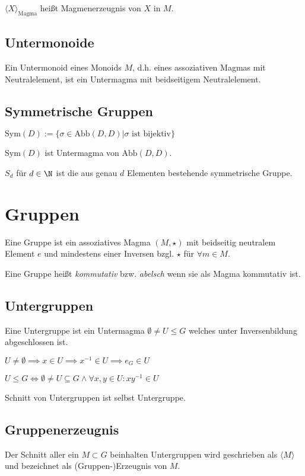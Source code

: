 $\langle X \rangle_{\text{Magma}}$ heißt Magmenerzeugnis von $X$ in $M$.

\subsection*{Untermonoide}

Ein Untermonoid eines Monoids $M$, d.h. eines assoziativen Magmas mit Neutralelement, ist ein Untermagma mit beidseitigem Neutralelement.

\subsection*{Symmetrische Gruppen}

$\text{Sym}(D) := \{ \sigma \in \text{Abb}(D,D) | \sigma \text{ ist bijektiv}\}$

$\text{Sym}(D)$ ist Untermagma von $\text{Abb}(D,D)$.

$S_d$ für $d \in \N$ ist die aus genau $d$ Elementen bestehende symmetrische Gruppe.

\section*{Gruppen}

Eine Gruppe ist ein assoziatives Magma $(M, \star)$ mit beidseitig neutralem Element $e$ und mindestens einer Inversen bzgl. $\star$ für $\forall m \in M$.

Eine Gruppe heißt \emph{kommutativ} bzw. \emph{abelsch} wenn sie als Magma kommutativ ist.

\subsection*{Untergruppen}

Eine Untergruppe ist ein Untermagma $\emptyset \neq U \leq G$ welches unter Inversenbildung abgeschlossen ist.

$U \neq \emptyset \implies x \in U \implies x^{-1} \in U \implies e_G \in U$

$U \leq G \iff \emptyset \neq U \subseteq G \land \forall x, y \in U : xy^{-1} \in U$

Schnitt von Untergruppen ist selbst Untergruppe.

\subsection*{Gruppenerzeugnis}

Der Schnitt aller ein $M \subset G$ beinhalten Untergruppen wird geschrieben als $\langle M \rangle$ und bezeichnet als (Gruppen-)Erzeugnis von $M$.

